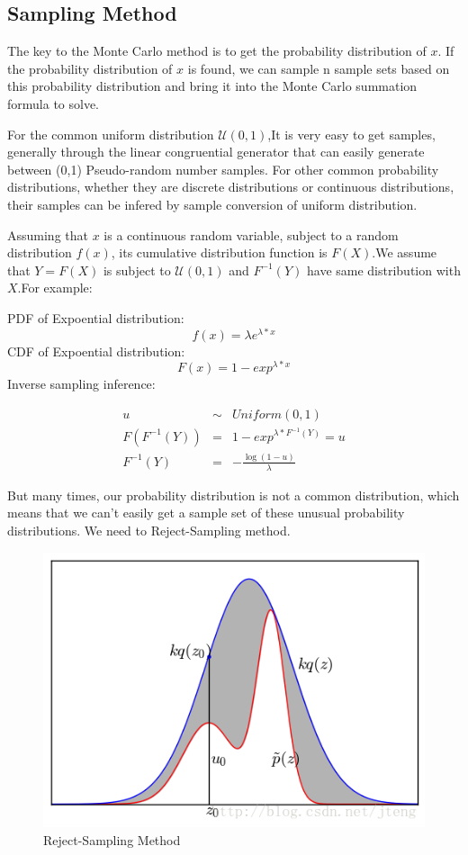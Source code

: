 \subsection{Sampling Method}
The key to the Monte Carlo method is to get the probability distribution of $x$. If the probability distribution of $x$ is found, we can sample n sample sets based on this probability distribution  and bring it into the Monte Carlo summation formula to solve.

For the common uniform distribution $\mathcal U (0,1)$,It  is very easy to get samples, generally through the linear congruential generator that can easily generate between (0,1) Pseudo-random number samples. For other common probability distributions, whether they are discrete distributions or continuous distributions, their samples can be infered by sample conversion of uniform distribution.

Assuming that $x$ is a continuous random variable, subject to a random distribution $f(x)$, its cumulative distribution function is $F(X)$.We assume that $Y = F(X)$ is subject to $\mathcal U (0,1)$ and $F^{-1}(Y)$ have same distribution with $X$.For example:

PDF of Expoential distribution:
\[
  f(x) = \lambda e^{\lambda*x}
\]
CDF of Expoential distribution:
\[
  F(x) = 1- exp^{\lambda*x}
\]
Inverse sampling inference:

\begin{eqnarray*}
u & \sim & Uniform(0,1) \\
F(F^{-1}(Y)) &=& 1- exp^{\lambda*F^{-1}(Y)} = u \\
F^{-1}(Y) &=&-\frac{\log(1-u)}{\lambda}
\end{eqnarray*}

But many times, our probability distribution is not a common distribution, which means that we can't easily get a sample set of these unusual probability distributions. We need to Reject-Sampling method.

\begin{figure}
  \includegraphics[width=\linewidth]{reject.png}
  \caption{Reject-Sampling Method}
  \label{fig:boat1}
\end{figure}

